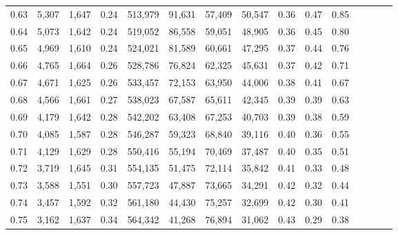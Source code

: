 \begin{tabular}{rrrcrrrrrrrrrrr}
0.63 &   5,307 &  1,647 &                                       0.24 &  513,979 &   91,631 &   57,409 &   50,547 &  0.36 &  0.47 &                         0.85 \\
0.64 &   5,073 &  1,642 &                                       0.24 &  519,052 &   86,558 &   59,051 &   48,905 &  0.36 &  0.45 &                         0.80 \\
0.65 &   4,969 &  1,610 &                                       0.24 &  524,021 &   81,589 &   60,661 &   47,295 &  0.37 &  0.44 &                         0.76 \\
0.66 &   4,765 &  1,664 &                                       0.26 &  528,786 &   76,824 &   62,325 &   45,631 &  0.37 &  0.42 &                         0.71 \\
0.67 &   4,671 &  1,625 &                                       0.26 &  533,457 &   72,153 &   63,950 &   44,006 &  0.38 &  0.41 &                         0.67 \\
0.68 &   4,566 &  1,661 &                                       0.27 &  538,023 &   67,587 &   65,611 &   42,345 &  0.39 &  0.39 &                         0.63 \\
0.69 &   4,179 &  1,642 &                                       0.28 &  542,202 &   63,408 &   67,253 &   40,703 &  0.39 &  0.38 &                         0.59 \\
0.70 &   4,085 &  1,587 &                                       0.28 &  546,287 &   59,323 &   68,840 &   39,116 &  0.40 &  0.36 &                         0.55 \\
0.71 &   4,129 &  1,629 &                                       0.28 &  550,416 &   55,194 &   70,469 &   37,487 &  0.40 &  0.35 &                         0.51 \\
0.72 &   3,719 &  1,645 &                                       0.31 &  554,135 &   51,475 &   72,114 &   35,842 &  0.41 &  0.33 &                         0.48 \\
0.73 &   3,588 &  1,551 &                                       0.30 &  557,723 &   47,887 &   73,665 &   34,291 &  0.42 &  0.32 &                         0.44 \\
0.74 &   3,457 &  1,592 &                                       0.32 &  561,180 &   44,430 &   75,257 &   32,699 &  0.42 &  0.30 &                         0.41 \\
0.75 &   3,162 &  1,637 &                                       0.34 &  564,342 &   41,268 &   76,894 &   31,062 &  0.43 &  0.29 &                         0.38 \\

\end{tabular}
